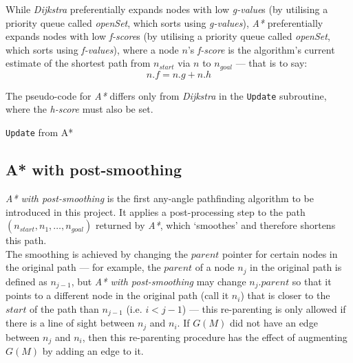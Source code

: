 \documentclass[12pt,notitlepage]{report}
\begin{document}
\noindent
While {\em Dijkstra} preferentially expands nodes with low {\em g-value}s (by utilising a priority queue called {\em openSet}, which sorts using {\em g-values}), {\em A*} preferentially expands nodes with low {\em f-score}s (by utilising a priority queue called {\em openSet}, which sorts using {\em f-values}), where a node $n$'s {\em f-score} is the algorithm's current estimate of the shortest path from $n_{start}$ via $n$ to $n_{goal}$ --- that is to say:
\begin{equation}
n.f = n.g + n.h
\end{equation}

\noindent
The pseudo-code for {\em A*} differs only from {\em Dijkstra} in the {\tt Update} subroutine, where the {\em h-score} must also be set.

\begin{algorithm}
  \SetAlgoLined\DontPrintSemicolon
  \caption{{\tt Update} from {\sc A*}}
\end{algorithm} 

\subsection {A* with post-smoothing}

{\em A* with post-smoothing} is the first any-angle pathfinding algorithm to be introduced in this project. It applies a post-processing step to the path $(n_{start}, n_{1}, \ldots, n_{goal})$ returned by {\em A*}, which `smoothes'  and therefore shortens this path.\\

\noindent The smoothing is achieved by changing the $parent$ pointer for certain nodes in the original path --- for example, the $parent$ of a node $n_{j}$ in the original path is defined as $n_{j-1}$, but {\em A* with post-smoothing} may change $n_{j}.parent$ so that it points to a different node in the original path (call it $n_{i}$) that is closer to the $start$ of the path than $n_{j-1}$ (i.e. $i<j-1$) --- this re-parenting is only allowed if there is a line of sight between $n_{j}$ and $n_{i}$. If $G(M)$ did not have an edge between $n_{j}$ and $n_{i}$, then this re-parenting procedure has the effect of augmenting $G(M)$ by adding an edge to it.\\
\end{document}
